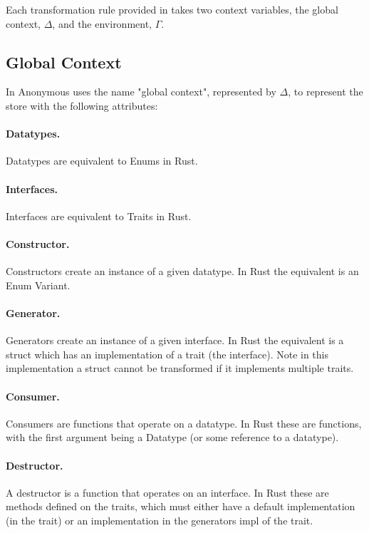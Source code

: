 \documentclass[ oneside,%
                    author={James Elgar},
                    degree={MEng},
                     title={Bidirectional transformer between functional and \\ object-oriented programming in Rust},
                  subtitle={}]{dissertation}
\newcommand{\weixin}{Anonymous }
\begin{document}
Each transformation rule provided in \cite{food} takes two context variables, the global context, $\Delta$, and the environment, $\Gamma$.

\subsection{Global Context}

In \cite{food} \weixin uses the name "global context", represented by $\Delta$, to represent the store with  the following attributes:

\paragraph{Datatypes.} Datatypes are equivalent to Enums in Rust.
\paragraph{Interfaces.} Interfaces are equivalent to Traits in Rust.
\paragraph{Constructor.} Constructors create an instance of a given datatype. In Rust the equivalent is an Enum Variant.
\paragraph{Generator.} Generators create an instance of a given interface. In Rust the equivalent is a struct which has an implementation of a trait (the interface). Note in this implementation a struct cannot be transformed if it implements multiple traits. 
\paragraph{Consumer.} Consumers are functions that operate on a datatype. In Rust these are functions, with the first argument being a Datatype (or some reference to a datatype).
\paragraph{Destructor.} A destructor is a function that operates on an interface. In Rust these are methods defined on the traits, which must either have a default implementation (in the trait) or an implementation in the generators impl of the trait.

\vspace{10pt}
\end{document}
